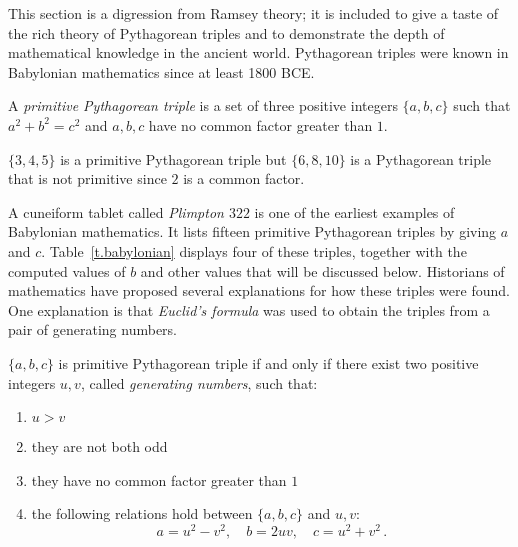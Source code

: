 This section is a digression from Ramsey theory; it is included to give a taste of the rich theory of Pythagorean triples and to demonstrate the depth of mathematical knowledge in the ancient world. Pythagorean triples were known in Babylonian mathematics since at least 1800 BCE.
\begin{definition}
A \emph{primitive Pythagorean triple} is a set of three positive integers $\{a,b,c\}$ such that $a^2+b^2=c^2$ and $a,b,c$ have no common factor greater than $1$.
\end{definition}
\begin{example}
$\{3,4,5\}$ is a primitive Pythagorean triple but $\{6,8,10\}$ is a Pythagorean triple that is not primitive since $2$ is a common factor.
\end{example}
A cuneiform tablet called \emph{Plimpton $322$} is one of the earliest examples of Babylonian mathematics. It lists fifteen primitive Pythagorean triples by giving $a$ and $c$. Table~\ref{t.babylonian} displays four of these triples, together with the computed values of $b$ and other values that will be discussed below. Historians of mathematics have proposed several explanations for how these triples were found. One explanation is that \emph{Euclid's formula} was used to obtain the triples from a pair of generating numbers.
\begin{theorem}[Euclid]
$\{a,b,c\}$ is primitive Pythagorean triple if and only if there exist two positive integers $u,v$, called \emph{generating numbers}, such that:\label{thm.euclid-function}
\begin{enumerate}
\item $u>v$
\item they are not both odd
\item they have no common factor greater than $1$
\item the following relations hold between $\{a,b,c\}$ and $u,v$:
\[
a=u^2-v^2,\quad b=2uv,\quad c=u^2+v^2\,.
\]
\end{enumerate}
\end{theorem}

